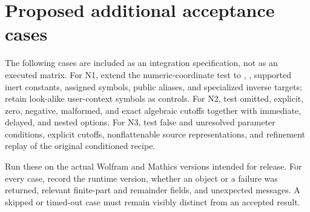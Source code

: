 \documentclass[11pt,letterpaper]{article}
\newcommand{\code}[1]{\texttt{\detokenize{#1}}}
\begin{document}
\section{Proposed additional acceptance cases}

The following cases are included as an integration specification, not as an executed matrix. For N1, extend the numeric-coordinate test to \code{E}, \code{EulerGamma}, supported inert constants, assigned symbols, public aliases, and specialized inverse targets; retain look-alike user-context symbols as controls. For N2, test omitted, explicit, zero, negative, malformed, and exact algebraic cutoffs together with immediate, delayed, and nested options. For N3, test false and unresolved parameter conditions, explicit cutoffs, nonflattenable source representations, and refinement replay of the original conditioned recipe.

Run these on the actual Wolfram and Mathics versions intended for release. For every case, record the runtime version, whether an object or a failure was returned, relevant finite-part and remainder fields, and unexpected messages. A skipped or timed-out case must remain visibly distinct from an accepted result.
\end{document}
